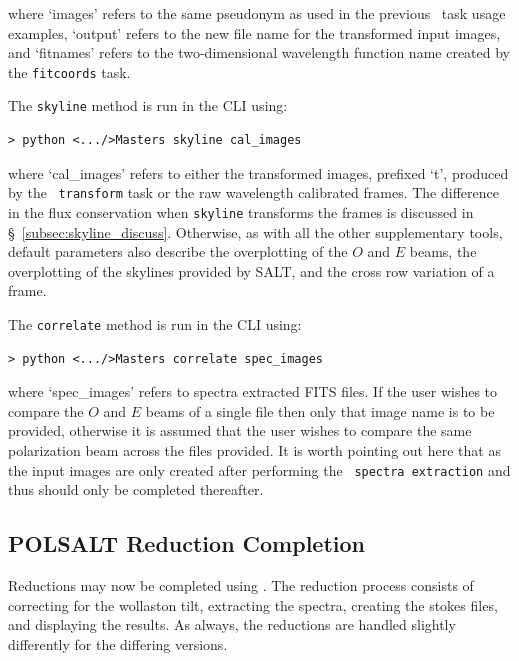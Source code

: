 \noindent where `images' refers to the same pseudonym as used in the previous \iraf\ task usage examples, `output' refers to the new file name for the transformed input images, and `fitnames' refers to the two-dimensional wavelength function name created by the \texttt{fitcoords} task.
\prgph

The \texttt{skyline} method is run in the \gls{CLI} using:

\begin{verbatim}> python <.../>Masters skyline cal_images\end{verbatim}

\noindent where `cal\_images' refers to either the transformed images, prefixed `t', produced by the \iraf\ \texttt{transform} task or the raw wavelength calibrated frames. The difference in the flux conservation when \texttt{skyline} transforms the frames is discussed in \S~\ref{subsec:skyline_discuss}. Otherwise, as with all the other supplementary tools, default parameters also describe the overplotting of the $O$ and $E$ beams, the overplotting of the skylines provided by \gls{SALT}, and the cross row variation of a frame.
\prgph

The \texttt{correlate} method is run in the \gls{CLI} using:

\begin{verbatim}> python <.../>Masters correlate spec_images\end{verbatim}

\noindent where `spec\_images' refers to spectra extracted \gls{FITS} files. If the user wishes to compare the $O$ and $E$ beams of a single file then only that image name is to be provided, otherwise it is assumed that the user wishes to compare the same polarization beam across the files provided. It is worth pointing out here that as the input images are only created after performing the \polsalt\ \texttt{spectra extraction} and thus should only be completed thereafter.


\subsection{POLSALT Reduction Completion} \label{subsec:reduc_com}

Reductions may now be completed using \polsalt. The reduction process consists of correcting for the wollaston tilt, extracting the spectra, creating the stokes files, and displaying the results. As always, the reductions are handled slightly differently for the differing versions.

